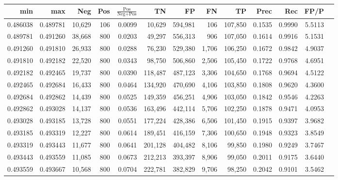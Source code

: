 \begin{tabular}{rrrrrrrrrrrrr}
\toprule
     min &      max &    Neg &   Pos & $\frac{\text{Pos}}{\text{Neg}+\text{Pos}}$ &      TN &      FP &      FN &      TP &   Prec &    Rec &   FP/P \\
\midrule
0.486038 & 0.489781 & 10,629 &   106 &                                     0.0099 &  10,629 & 594,981 &     106 & 107,850 & 0.1535 & 0.9990 & 5.5113 \\
0.489781 & 0.491260 & 38,668 &   800 &                                     0.0203 &  49,297 & 556,313 &     906 & 107,050 & 0.1614 & 0.9916 & 5.1531 \\
0.491260 & 0.491810 & 26,933 &   800 &                                     0.0288 &  76,230 & 529,380 &   1,706 & 106,250 & 0.1672 & 0.9842 & 4.9037 \\
0.491810 & 0.492182 & 22,520 &   800 &                                     0.0343 &  98,750 & 506,860 &   2,506 & 105,450 & 0.1722 & 0.9768 & 4.6951 \\
0.492182 & 0.492465 & 19,737 &   800 &                                     0.0390 & 118,487 & 487,123 &   3,306 & 104,650 & 0.1768 & 0.9694 & 4.5122 \\
0.492465 & 0.492684 & 16,433 &   800 &                                     0.0464 & 134,920 & 470,690 &   4,106 & 103,850 & 0.1808 & 0.9620 & 4.3600 \\
0.492684 & 0.492862 & 14,439 &   800 &                                     0.0525 & 149,359 & 456,251 &   4,906 & 103,050 & 0.1842 & 0.9546 & 4.2263 \\
0.492862 & 0.493028 & 14,137 &   800 &                                     0.0536 & 163,496 & 442,114 &   5,706 & 102,250 & 0.1878 & 0.9471 & 4.0953 \\
0.493028 & 0.493185 & 13,728 &   800 &                                     0.0551 & 177,224 & 428,386 &   6,506 & 101,450 & 0.1915 & 0.9397 & 3.9682 \\
0.493185 & 0.493319 & 12,227 &   800 &                                     0.0614 & 189,451 & 416,159 &   7,306 & 100,650 & 0.1948 & 0.9323 & 3.8549 \\
0.493319 & 0.493443 & 11,677 &   800 &                                     0.0641 & 201,128 & 404,482 &   8,106 &  99,850 & 0.1980 & 0.9249 & 3.7467 \\
0.493443 & 0.493559 & 11,085 &   800 &                                     0.0673 & 212,213 & 393,397 &   8,906 &  99,050 & 0.2011 & 0.9175 & 3.6440 \\
0.493559 & 0.493667 & 10,568 &   800 &                                     0.0704 & 222,781 & 382,829 &   9,706 &  98,250 & 0.2042 & 0.9101 & 3.5462 \\

\end{tabular}
